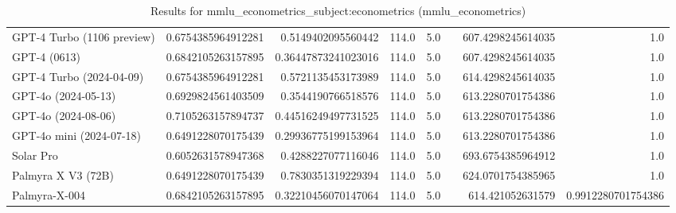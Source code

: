 \begin{table}[htp]
{\begin{tabular}{lrrrrrrr}
GPT-4 Turbo (1106 preview) & 0.6754385964912281 & 0.5149402095560442 & 114.0 & 5.0 &  & 607.4298245614035 & 1.0 \\
GPT-4 (0613) & 0.6842105263157895 & 0.36447873241023016 & 114.0 & 5.0 &  & 607.4298245614035 & 1.0 \\
GPT-4 Turbo (2024-04-09) & 0.6754385964912281 & 0.5721135453173989 & 114.0 & 5.0 &  & 614.4298245614035 & 1.0 \\
GPT-4o (2024-05-13) & 0.6929824561403509 & 0.3544190766518576 & 114.0 & 5.0 &  & 613.2280701754386 & 1.0 \\
GPT-4o (2024-08-06) & 0.7105263157894737 & 0.44516249497731525 & 114.0 & 5.0 &  & 613.2280701754386 & 1.0 \\
GPT-4o mini (2024-07-18) & 0.6491228070175439 & 0.29936775199153964 & 114.0 & 5.0 &  & 613.2280701754386 & 1.0 \\
Solar Pro & 0.6052631578947368 & 0.4288227077116046 & 114.0 & 5.0 &  & 693.6754385964912 & 1.0 \\
Palmyra X V3 (72B) & 0.6491228070175439 & 0.7830351319229394 & 114.0 & 5.0 &  & 624.0701754385965 & 1.0 \\
Palmyra-X-004 & 0.6842105263157895 & 0.32210456070147064 & 114.0 & 5.0 &  & 614.421052631579 & 0.9912280701754386 \\
\bottomrule
\end{tabular}}
\caption{Results for mmlu_econometrics_subject:econometrics (mmlu_econometrics)}
\label{fig:mmlu_econometrics_subject:econometrics (mmlu_econometrics)}
\end{table}